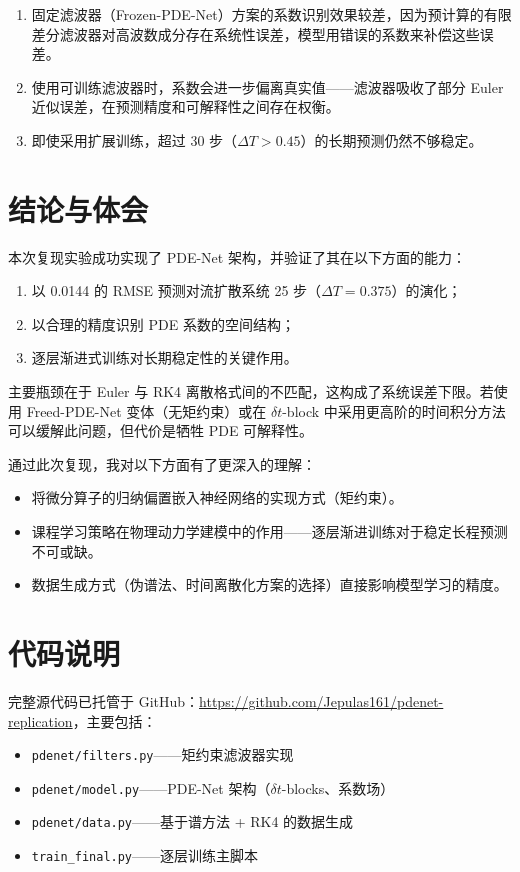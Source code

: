 \documentclass[11pt,a4paper]{article}
\begin{document}
\begin{enumerate}
    \item 固定滤波器（Frozen-PDE-Net）方案的系数识别效果较差，因为预计算的有限差分滤波器对高波数成分存在系统性误差，模型用错误的系数来补偿这些误差。
    \item 使用可训练滤波器时，系数会进一步偏离真实值——滤波器吸收了部分 Euler 近似误差，在预测精度和可解释性之间存在权衡。
    \item 即使采用扩展训练，超过 30 步（$\Delta T > 0.45$）的长期预测仍然不够稳定。
\end{enumerate}

\section{结论与体会}

本次复现实验成功实现了 PDE-Net 架构，并验证了其在以下方面的能力：
\begin{enumerate}
    \item 以 0.0144 的 RMSE 预测对流扩散系统 25 步（$\Delta T = 0.375$）的演化；
    \item 以合理的精度识别 PDE 系数的空间结构；
    \item 逐层渐进式训练对长期稳定性的关键作用。
\end{enumerate}

主要瓶颈在于 Euler 与 RK4 离散格式间的不匹配，这构成了系统误差下限。若使用 Freed-PDE-Net 变体（无矩约束）或在 $\delta t$-block 中采用更高阶的时间积分方法可以缓解此问题，但代价是牺牲 PDE 可解释性。

通过此次复现，我对以下方面有了更深入的理解：
\begin{itemize}
    \item 将微分算子的归纳偏置嵌入神经网络的实现方式（矩约束）。
    \item 课程学习策略在物理动力学建模中的作用——逐层渐进训练对于稳定长程预测不可或缺。
    \item 数据生成方式（伪谱法、时间离散化方案的选择）直接影响模型学习的精度。
\end{itemize}

\section*{代码说明}

完整源代码已托管于 GitHub：\url{https://github.com/Jepulas161/pdenet-replication}，主要包括：
\begin{itemize}
    \item \texttt{pdenet/filters.py}——矩约束滤波器实现
    \item \texttt{pdenet/model.py}——PDE-Net 架构（$\delta t$-blocks、系数场）
    \item \texttt{pdenet/data.py}——基于谱方法 + RK4 的数据生成
    \item \texttt{train\_final.py}——逐层训练主脚本
\end{itemize}
\end{document}
